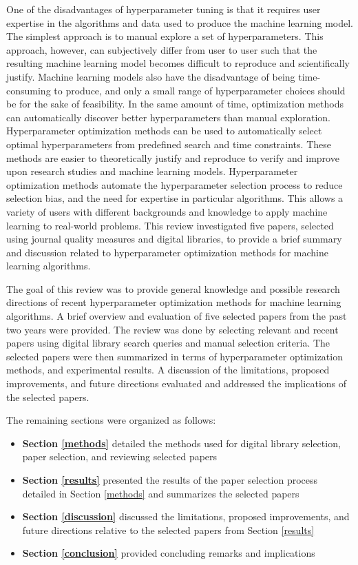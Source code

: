 One of the disadvantages of hyperparameter tuning is that it requires user expertise in the algorithms and data used to produce the machine learning model. The simplest approach is to manual explore a set of hyperparameters. This approach, however, can subjectively differ from user to user such that the resulting machine learning model becomes difficult to reproduce and scientifically justify. Machine learning models also have the disadvantage of being time-consuming to produce, and only a small range of hyperparameter choices should be for the sake of feasibility. In the same amount of time, optimization methods can automatically discover better hyperparameters than manual exploration. Hyperparameter optimization methods can be used to automatically select optimal hyperparameters from predefined search and time constraints. These methods are easier to theoretically justify and reproduce to verify and improve upon research studies and machine learning models. Hyperparameter optimization methods automate the hyperparameter selection process to reduce selection bias, and the need for expertise in particular algorithms. This allows a variety of users with different backgrounds and knowledge to apply machine learning to real-world problems. This review investigated five papers, selected using journal quality measures and digital libraries, to provide a brief summary and discussion related to hyperparameter optimization methods for machine learning algorithms.

The goal of this review was to provide general knowledge and possible research directions of recent hyperparameter optimization methods for machine learning algorithms. A brief overview and evaluation of five selected papers from the past two years were provided. The review was done by selecting relevant and recent papers using digital library search queries and manual selection criteria. The selected papers were then summarized in terms of hyperparameter optimization methods, and experimental results. A discussion of the limitations, proposed improvements, and future directions evaluated and addressed the implications of the selected papers.

The remaining sections were organized as follows:

\begin{itemize}
  \item \textbf{Section \ref{methods}} detailed the methods used for digital library selection, paper selection, and reviewing selected papers
  \item \textbf{Section \ref{results}} presented the results of the paper selection process detailed in Section \ref{methods} and summarizes the selected papers
  \item \textbf{Section \ref{discussion}} discussed the limitations, proposed improvements, and future directions relative to the selected papers from Section \ref{results}
  \item \textbf{Section \ref{conclusion}} provided concluding remarks and implications
\end{itemize}


